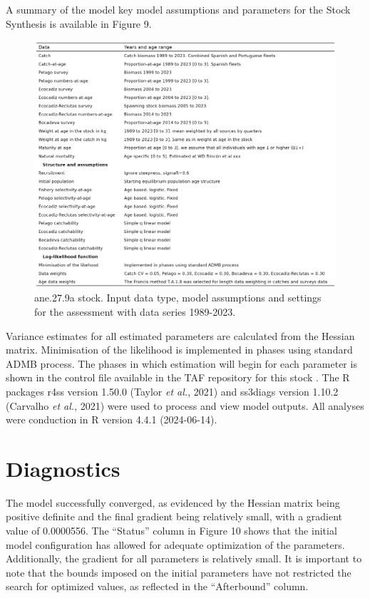 \documentclass[
]{article}
\begin{document}
A summary of the model key model assumptions and parameters for the
Stock Synthesis is available in Figure 9.

\begin{figure}[H]

{\centering \includegraphics[width=0.95\linewidth]{report/run/S1.0_4FLEETS/tb_dat_stru} 

}

\caption{ane.27.9a stock. Input data type, model assumptions and settings for the assessment  with data series 1989-2023.}\label{fig:unnamed-chunk-12}
\end{figure}

Variance estimates for all estimated parameters are calculated from the
Hessian matrix. Minimisation of the likelihood is implemented in phases
using standard ADMB process. The phases in which estimation will begin
for each parameter is shown in the control file available in the TAF
repository for this stock . The R packages r4ss version 1.50.0 (Taylor
\emph{et al.}, 2021) and ss3diags version 1.10.2 (Carvalho \emph{et
al.}, 2021) were used to process and view model outputs. All analyses
were conduction in R version 4.4.1 (2024-06-14).

\hypertarget{diagnostics}{%
\section{Diagnostics}\label{diagnostics}}

The model successfully converged, as evidenced by the Hessian matrix
being positive definite and the final gradient being relatively small,
with a gradient value of 0.0000556. The ``Status'' column in Figure 10
shows that the initial model configuration has allowed for adequate
optimization of the parameters. Additionally, the gradient for all
parameters is relatively small. It is important to note that the bounds
imposed on the initial parameters have not restricted the search for
optimized values, as reflected in the ``Afterbound'' column.
\end{document}
